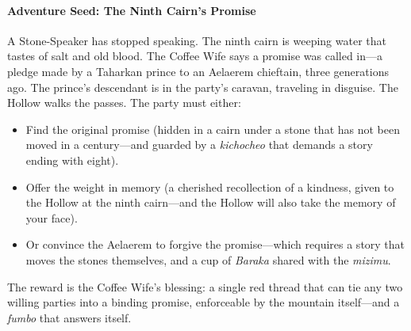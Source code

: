 \paragraph{Adventure Seed: The Ninth Cairn's Promise}
A Stone-Speaker has stopped speaking. The ninth cairn is weeping water that tastes of salt and old blood. The Coffee Wife says a promise was called in---a pledge made by a Taharkan prince to an Aelaerem chieftain, three generations ago. The prince's descendant is in the party's caravan, traveling in disguise. The Hollow walks the passes. The party must either:
\begin{itemize}
\item Find the original promise (hidden in a cairn under a stone that has not been moved in a century---and guarded by a \textit{kichocheo} that demands a story ending with eight).
\item Offer the weight in memory (a cherished recollection of a kindness, given to the Hollow at the ninth cairn---and the Hollow will also take the memory of your face).
\item Or convince the Aelaerem to forgive the promise---which requires a story that moves the stones themselves, and a cup of \textit{Baraka} shared with the \textit{mizimu}.
\end{itemize}
The reward is the Coffee Wife's blessing: a single red thread that can tie any two willing parties into a binding promise, enforceable by the mountain itself---and a \textit{fumbo} that answers itself.

